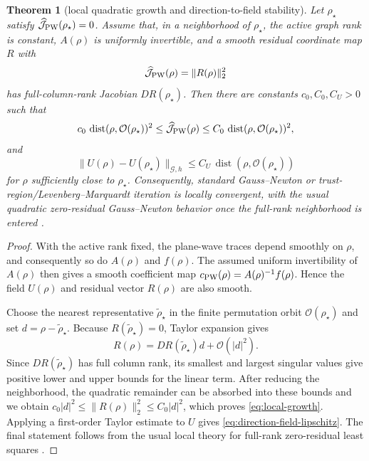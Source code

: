\documentclass[pdflatex,sn-mathphys-num]{sn-jnl}
\theoremstyle{thmstyleone}
\newtheorem{theorem}{Theorem}[section]
\theoremstyle{thmstyletwo}
\begin{document}
\begin{theorem}[local quadratic growth and direction-to-field stability]\label{thm:local-growth}
Let $\rho_\star$ satisfy $\widehat{\mathcal J}_{\rm PW}(\rho_\star)=0$.  Assume that, in a neighborhood of $\rho_\star$, the active graph rank is constant, $A(\rho)$ is uniformly invertible, and a smooth residual coordinate map $R$ with
\[
 \widehat{\mathcal J}_{\rm PW}(\rho)=\|R(\rho)\|_2^2
\]
has full-column-rank Jacobian $DR(\rho_\star)$.  Then there are constants $c_0,C_0,C_U>0$ such that
\begin{equation}\label{eq:local-growth}
 c_0\,\operatorname{dist}(\rho,\mathcal O(\rho_\star))^2
 \le \widehat{\mathcal J}_{\rm PW}(\rho)
 \le C_0\,\operatorname{dist}(\rho,\mathcal O(\rho_\star))^2,
\end{equation}
and
\begin{equation}\label{eq:direction-field-lipschitz}
 \|U(\rho)-U(\rho_\star)\|_{\mathcal G,h}
 \le C_U\,\operatorname{dist}(\rho,\mathcal O(\rho_\star))
\end{equation}
for $\rho$ sufficiently close to $\rho_\star$.  Consequently, standard Gauss--Newton or trust-region/Levenberg--Marquardt iteration is locally convergent, with the usual quadratic zero-residual Gauss--Newton behavior once the full-rank neighborhood is entered \cite{More1978}.
\end{theorem}
\begin{proof}
With the active rank fixed, the plane-wave traces depend smoothly on $\rho$, and consequently so do $A(\rho)$ and $f(\rho)$.  The assumed uniform invertibility of $A(\rho)$ then gives a smooth coefficient map $c_{\rm PW}(\rho)=A(\rho)^{-1}f(\rho)$.  Hence the field $U(\rho)$ and residual vector $R(\rho)$ are also smooth.

Choose the nearest representative $\widetilde\rho_\star$ in the finite permutation orbit $\mathcal O(\rho_\star)$ and set $d=\rho-\widetilde\rho_\star$.  Because $R(\widetilde\rho_\star)=0$, Taylor expansion gives
\[
 R(\rho)=DR(\widetilde\rho_\star)d+\mathcal O(|d|^2).
\]
Since $DR(\widetilde\rho_\star)$ has full column rank, its smallest and largest singular values give positive lower and upper bounds for the linear term.  After reducing the neighborhood, the quadratic remainder can be absorbed into these bounds and we obtain $c_0|d|^2\leq\|R(\rho)\|_2^2\leq C_0|d|^2$, which proves \eqref{eq:local-growth}.  Applying a first-order Taylor estimate to $U$ gives \eqref{eq:direction-field-lipschitz}.  The final statement follows from the usual local theory for full-rank zero-residual least squares \cite{More1978}.
\end{proof}
\end{document}
